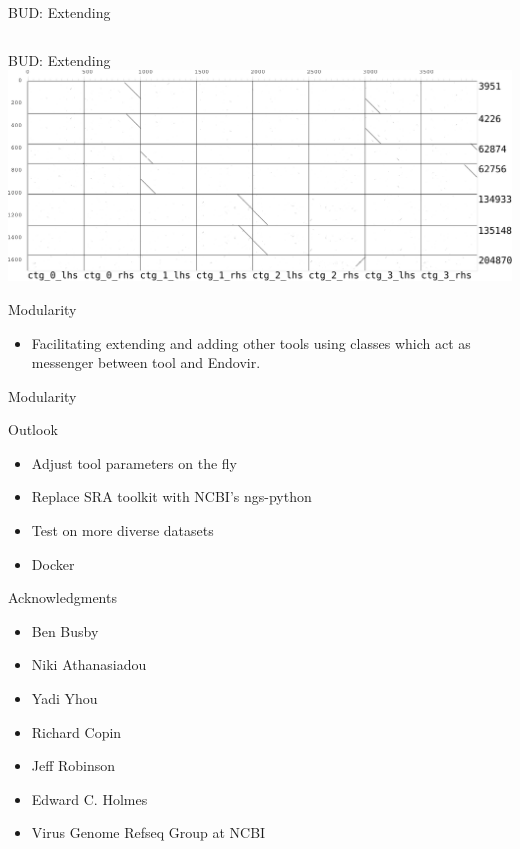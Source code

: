 \documentclass{beamer}
\begin{document}
  \begin{frame}{BUD: Extending}
    \begin{columns}
      \begin{column}{0.5\textwidth}
        
      \end{column}
      \begin{column}{0.5\textwidth}
        
      \end{column}
    \end{columns}
  \end{frame}

  \begin{frame}{BUD: Extending}
    \includegraphics[width=0.9\linewidth]{figs/ebovexample/flanks/flankext.pdf}
  \end{frame}

  \begin{frame}{Modularity}
    \begin{itemize}
     \item Facilitating extending and adding other tools using classes
           which act as messenger between tool and Endovir.
    \end{itemize}
    
  \end{frame}

  \begin{frame}{Modularity}
    
  \end{frame}

  \begin{frame}{Outlook}
    \begin{itemize}
     \item Adjust tool parameters on the fly
     \item Replace SRA toolkit with NCBI's ngs-python
     \item Test on more diverse datasets
     \item Docker
    \end{itemize}
  \end{frame}

  \begin{frame}{Acknowledgments}
    \begin{itemize}
     \item Ben Busby
     \item Niki Athanasiadou
     \item Yadi Yhou
     \item Richard Copin
     \item Jeff Robinson
     \item Edward C. Holmes
     \item Virus Genome Refseq Group at NCBI
    \end{itemize}
  \end{frame}
\end{document}
